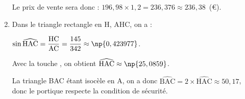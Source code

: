 \begin{enumerate}
Le prix de vente sera donc : $196,98 \times 1,2 = 236,376 \approx 236,38$~(\euro).
\item %

Dans le triangle rectangle en H, AHC, on a :

$\sin \widehat{\text{HAC}} = \dfrac{\text{HC}}{\text{AC}} = \dfrac{145}{342} \approx \np{0,423977}$.

Avec la touche , on obtient $\widehat{\text{HAC}} \approx \np{25,0859}$.

La triangle BAC étant isocèle en A, on a donc $\widehat{\text{BAC}}  = 2 \times \widehat{\text{HAC}} \approx 50,17$, donc le portique respecte la condition de sécurité.
\end{enumerate}

\bigskip


